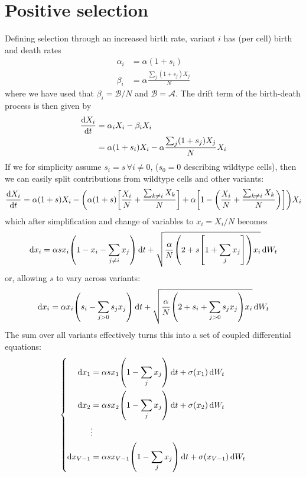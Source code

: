 \documentclass[pdftex,12pt,a4paper]{scrartcl}
\begin{document}
\section{Positive selection}
Defining selection through an increased birth rate, variant $i$ has (per cell) birth and death rates
\begin{equation}
\begin{aligned}
    \alpha_i &= \alpha(1+s_i) \\
    \beta_i &= \alpha \frac{\sum_j (1+s_j)X_j}{N}
\end{aligned}
\end{equation}
where we have used that $\beta_i = \mathcal{B} / N$ and $\mathcal{B} = \mathcal{A}$. The drift term of the birth-death process is then given by
\begin{align*}
    \dv{X_i}{t} &= \alpha_i X_i - \beta_i X_i \\
    &= \alpha(1+s_i) X_i - \alpha \frac{\sum_j (1+s_j)X_j}{N} X_i
\end{align*}
If we for simplicity assume $s_i = s \, \forall i \neq 0$, ($s_0 = 0$ describing wildtype cells), then we can easily split contributions from wildtype cells and other variants:
\begin{equation}
    \dv{X_i}{t} = \alpha(1+s)X_i - \qty( \alpha(1+s) \qty[ \frac{X_i}{N} + \frac{\sum_{k\neq i}X_k}{N} ] + \alpha \qty[ 1- \qty( \frac{X_i}{N} + \frac{\sum_{k\neq i} X_k}{N} ) ] )X_i
\end{equation}
which after simplification and change of variables to $x_i = X_i/N$ becomes
\begin{equation}
    \dd{x_i} = \alpha s x_i \qty( 1 - x_i - \sum_{j \neq i} x_j ) \dd{t} + \sqrt{ \frac{\alpha}{N} \qty( 2 + s \qty[1+ \sum_j x_j] ) x_i } \dd{W_t}
\end{equation}
or, allowing $s$ to vary across variants:
\begin{equation}
    \dd{x_i} = \alpha x_i \qty( s_i - \sum_{j>0} s_j x_j ) \dd{t} + \sqrt{ \frac{\alpha}{N} \qty( 2 + s_i + \sum_{j>0} s_j x_j ) x_i } \dd{W_t}
\end{equation}
The sum over all variants effectively turns this into a set of coupled differential equations:
\begin{equation}
\left\lbrace
\begin{aligned}
    \dd{x_1} &= \alpha s x_1 \qty( 1 - \sum_{j} x_j ) \dd{t} + \sigma(x_1) \dd{W_t} \\
    \dd{x_2} &= \alpha s x_2 \qty( 1 - \sum_{j} x_j ) \dd{t} + \sigma(x_2) \dd{W_t} \\
    &\vdots \\
    \dd{x_{V-1}} &= \alpha s x_{V-1} \qty( 1 - \sum_{j} x_j ) \dd{t} + \sigma(x_{V-1}) \dd{W_t} \\
\end{aligned}
\right.
\end{equation}
\end{document}
